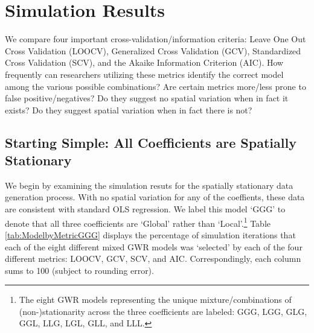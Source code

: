 \documentclass{article}\usepackage[]{graphicx}\usepackage[]{color}
\begin{document}
\section{Simulation Results}

We compare four important cross-validation/information criteria: Leave One Out Cross Validation (LOOCV), Generalized Cross Validation (GCV), Standardized Cross Validation (SCV), and the Akaike Information Criterion (AIC). How frequently can researchers utilizing these metrics identify the correct model among the various possible combinations? Are certain metrics more/less prone to false positive/negatives? Do they suggest no spatial variation when in fact it exists? Do they suggest spatial variation when in fact there is not? 

\subsection{Starting Simple: All Coefficients are Spatially Stationary}

We begin by examining the simulation resuts for the spatially stationary data generation process. With no spatial variation for any of the coeffients, these data are consistent with standard OLS regression. We label this model `GGG' to denote that all three coefficients are `Global' rather than `Local'.\footnote{The eight GWR models representing the unique mixture/combinations of (non-)stationarity across the three coefficients are labeled: GGG, LGG, GLG, GGL, LLG, LGL, GLL, and LLL.} Table \ref{tab:ModelbyMetricGGG} displays the percentage of simulation iterations that each of the eight different mixed GWR models was `selected' by each of the four different metrics: LOOCV, GCV, SCV, and AIC. Correspondingly, each column sums to 100 (subject to rounding error). 
\end{document}
